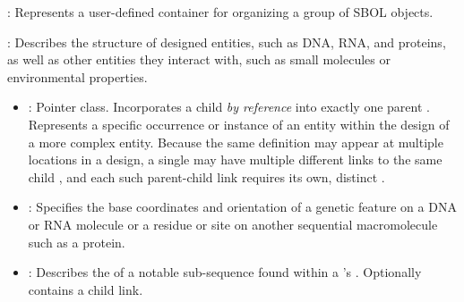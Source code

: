 \begin{description}

\item \emph{}:
Represents a user-defined container for organizing a group of SBOL objects.

\item \emph{}: Describes the structure of designed entities, such as DNA, RNA, and proteins, as well as other entities they interact with, such as small molecules or environmental properties.

\begin{itemize}
\item \emph{}:
Pointer class. Incorporates a child  \textit{by reference} into exactly one parent . Represents a specific occurrence or instance of an entity within the design of a more complex entity. Because the same definition may appear at multiple locations in a design, a single  may have multiple different links to the same child , and each such parent-child link requires its own, distinct .

\item \emph{}:
Specifies the base coordinates and orientation of a genetic feature on a DNA or RNA molecule or a residue or site on another sequential macromolecule such as a protein.

\item \emph{}:
Describes the  of a notable sub-sequence found within a \newline
{}'s . Optionally contains a child  link.


\end{itemize}
\end{description}

